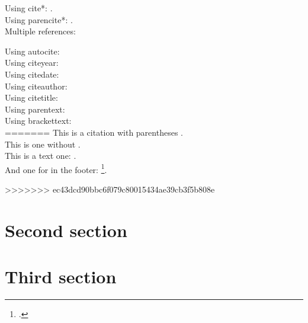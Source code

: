 Using cite*: \cite*{RN4}.\\

Using parencite*: \parencite*{RN4}.\\

Multiple references: \parencites[35]{RN4}[88--120]{RN6}[23]{RN3} %

Using autocite: \autocite[prenote][postnote]{RN4}\\

Using citeyear: \citeyear{RN4}\\

Using citedate: \\

Using citeauthor: \citeauthor{RN4}\\
 
Using citetitle: \\

Using parentext: \\

Using brackettext: \\

=======
This is a citation with parentheses \parencite{RN4}.\\

This is one without \cite[prenote][postnote]{RN4}.\\

This is a text one: \textcite{RN4}.\\

And one for in the footer: \footcite[prenote][postnote]{RN4}. 
 
>>>>>>> ec43dcd90bbc6f079c80015434ae39cb3f5b808e
\section{Second section}
\section{Third section}